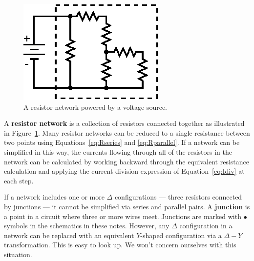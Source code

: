 \documentclass[11pt]{article}
\begin{document}
\begin{figure}[ht]
  \begin{center}
    \includegraphics{rnetwork.eps}
    \caption{A resistor network powered by a voltage source.}
    \label{fig:rnetwork}
  \end{center}
\end{figure}

A \textbf{resistor network} is a collection of resistors connected
together as illustrated in Figure~\ref{fig:rnetwork}. Many resistor
networks can be reduced to a single resistance between two points using
Equations~\ref{eq:Rseries} and \ref{eq:Rparallel}. If a network can
be simplified in this way, the currents flowing through all of the
resistors in the network can be calculated by working backward through
the equivalent resistance calculation and applying the current
division expression of Equation~\ref{eq:Idiv} at each step.

If a network includes one or more $\Delta$ configurations --- three
resistors connected by junctions --- it cannot be simplified
via series and parallel pairs. A \textbf{junction} is a point in a
circuit where three or more wires meet. Junctions are marked with
$\bullet$ symbols in the schematics in these notes. However, any
$\Delta$ configuration in a network can be replaced with an equivalent
$Y$-shaped configuration via a $\Delta-Y$ transformation. This is easy
to look up. We won't concern ourselves with this situation.

\begin{latexonly}
  \noindent
  \hrulefill
\end{latexonly}
\htmlrule
\end{document}
